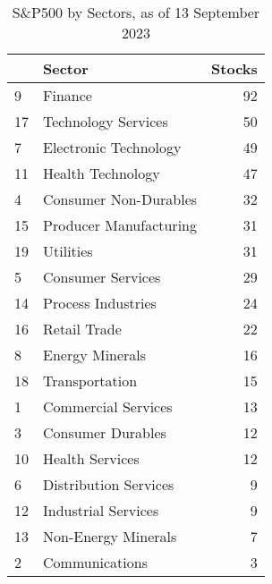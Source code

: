 \documentclass[
  letterpaper,
  DIV=11,
  numbers=noendperiod]{scrreport}
\newenvironment{Shaded}{\begin{snugshade}}{\end{snugshade}}
\newcommand{\AttributeTok}[1]{\textcolor[rgb]{0.40,0.45,0.13}{#1}}
\newcommand{\CommentTok}[1]{\textcolor[rgb]{0.37,0.37,0.37}{#1}}
\newcommand{\FunctionTok}[1]{\textcolor[rgb]{0.28,0.35,0.67}{#1}}
\newcommand{\NormalTok}[1]{\textcolor[rgb]{0.00,0.23,0.31}{#1}}
\newcommand{\OtherTok}[1]{\textcolor[rgb]{0.00,0.23,0.31}{#1}}
\newcommand{\SpecialCharTok}[1]{\textcolor[rgb]{0.37,0.37,0.37}{#1}}
\newcommand{\StringTok}[1]{\textcolor[rgb]{0.13,0.47,0.30}{#1}}
\begin{document}
\begin{Shaded}
\end{Shaded}

\begin{table}

\caption{S&P500 by Sectors, as of 13 September 2023}
\centering
\begin{tabular}[t]{l|l|r}
\hline
  & Sector & Stocks\\
\hline
9 & Finance & 92\\
\hline
17 & Technology Services & 50\\
\hline
7 & Electronic Technology & 49\\
\hline
11 & Health Technology & 47\\
\hline
4 & Consumer Non-Durables & 32\\
\hline
15 & Producer Manufacturing & 31\\
\hline
19 & Utilities & 31\\
\hline
5 & Consumer Services & 29\\
\hline
14 & Process Industries & 24\\
\hline
16 & Retail Trade & 22\\
\hline
8 & Energy Minerals & 16\\
\hline
18 & Transportation & 15\\
\hline
1 & Commercial Services & 13\\
\hline
3 & Consumer Durables & 12\\
\hline
10 & Health Services & 12\\
\hline
6 & Distribution Services & 9\\
\hline
12 & Industrial Services & 9\\
\hline
13 & Non-Energy Minerals & 7\\
\hline
2 & Communications & 3\\
\hline
\end{tabular}
\end{table}
\end{document}

